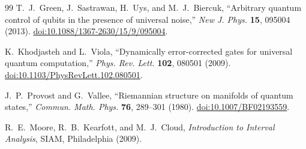 \documentclass[11pt]{article}
\begin{document}
\begin{thebibliography}{99}
T.~J.~Green, J.~Sastrawan, H.~Uys, and M.~J.~Biercuk,
``Arbitrary quantum control of qubits in the presence of universal noise,''
\emph{New J. Phys.} \textbf{15}, 095004 (2013).
\href{https://doi.org/10.1088/1367-2630/15/9/095004}
{doi:10.1088/1367-2630/15/9/095004}.

K.~Khodjasteh and L.~Viola,
``Dynamically error-corrected gates for universal quantum computation,''
\emph{Phys. Rev. Lett.} \textbf{102}, 080501 (2009).
\href{https://doi.org/10.1103/PhysRevLett.102.080501}
{doi:10.1103/PhysRevLett.102.080501}.

J.~P.~Provost and G.~Vallee,
``Riemannian structure on manifolds of quantum states,''
\emph{Commun. Math. Phys.} \textbf{76}, 289--301 (1980).
\href{https://doi.org/10.1007/BF02193559}
{doi:10.1007/BF02193559}.

R.~E.~Moore, R.~B.~Kearfott, and M.~J.~Cloud,
\emph{Introduction to Interval Analysis},
SIAM, Philadelphia (2009).

\end{thebibliography}
\end{document}
